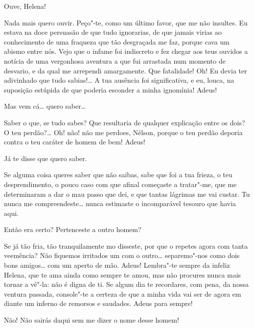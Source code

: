 {  Ouve, Helena!

  Nada mais quero ouvir. Peço"-te, como um
último favor, que me não insultes. Eu estava na doce persuasão de que
tudo ignorarias, de que jamais virias ao conhecimento de uma fraqueza
que tão desgraçada me faz, porque cava um abismo entre nós. Vejo que o
infame foi indiscreto e fez chegar aos teus ouvidos a notícia de uma
vergonhosa aventura a que fui arrastada num momento de desvario, e da
qual me arrependi amargamente. Que fatalidade!  Oh! Eu devia ter adivinhado que tudo sabias!\ldots{} A
tua ausência foi significativa, e eu, louca, na suposição estúpida de
que poderia esconder a minha ignomínia!  Adeus!

  Mas vem cá\ldots{} quero saber\ldots{}

  Saber o que, se tudo sabes? Que resultaria de
qualquer explicação entre os dois? O teu perdão?\ldots{} Oh! não! não me
perdoes, Nélson, porque o teu perdão deporia contra o teu caráter de
homem de bem!  Adeus!

   Já te
disse que quero saber.

  Se alguma coisa queres saber que não saibas,
sabe que foi a tua frieza, o teu desprendimento, o pouco caso com que
afinal começaste a tratar"-me, que me determinaram a dar o mau passo que
dei, e que tantas lágrimas me vai custar. Tu nunca me compreendeste\ldots{} 
nunca estimaste o incomparável tesouro que havia aqui. 

   Então era certo?
Pertenceste a outro homem?

   Se já tão
fria, tão tranquilamente mo disseste, por que o repetes agora com tanta
veemência? Não fiquemos irritados um com o outro\ldots{} separemo"-nos como
dois bons amigos\ldots{} com um aperto de mão.  Adeus! Lembra"-te sempre da infeliz Helena, que te ama
ainda como sempre te amou, mas não procures nunca mais tornar a vê"-la:
não é digna de ti.  Se algum dia te recordares, com pena, da nossa
ventura passada, console"-te a certeza de que a minha vida vai ser de
agora em diante um inferno de remorsos e saudades. Adeus para sempre!

   Não! Não sairás daqui
sem me dizer o nome desse homem!

}
